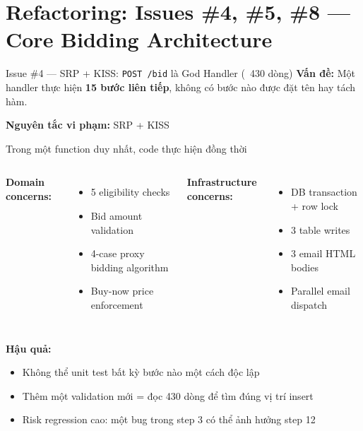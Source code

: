 \documentclass[12pt]{beamer}
\begin{document}
\section{Refactoring: Issues \#4, \#5, \#8 — Core Bidding Architecture}

\begin{frame}{Issue \#4 — SRP + KISS: \texttt{POST /bid} là God Handler (~430 dòng)}
  \textbf{Vấn đề:} Một handler thực hiện \textbf{15 bước liên tiếp}, không có bước nào được đặt tên hay tách hàm.

  \bigskip
  \textbf{Nguyên tắc vi phạm:} \alert{SRP} + \alert{KISS}

  \bigskip
  \begin{block}{Trong một function duy nhất, code thực hiện đồng thời}
    \begin{columns}[t]
      \textbf{Domain concerns:}
      \begin{itemize}
        \item 5 eligibility checks
        \item Bid amount validation
        \item 4-case proxy bidding algorithm
        \item Buy-now price enforcement
      \end{itemize}
      \textbf{Infrastructure concerns:}
      \begin{itemize}
        \item DB transaction + row lock
        \item 3 table writes
        \item 3 email HTML bodies
        \item Parallel email dispatch
      \end{itemize}
    \end{columns}
  \end{block}

  \bigskip
  \textbf{Hậu quả:}
  \begin{itemize}
    \item Không thể unit test bất kỳ bước nào một cách độc lập
    \item Thêm một validation mới = đọc 430 dòng để tìm đúng vị trí insert
    \item Risk regression cao: một bug trong step 3 có thể ảnh hưởng step 12
  \end{itemize}
\end{frame}
\end{document}
